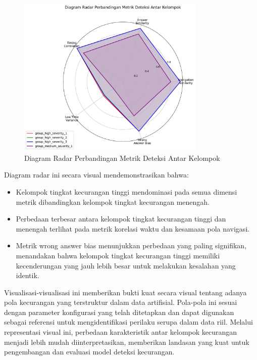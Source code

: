 \begin{figure}[htbp]
    \centering
    \includegraphics[width=0.8\textwidth]{figures/radar_chart_comparison.pdf}
    \caption{Diagram Radar Perbandingan Metrik Deteksi Antar Kelompok}
    \label{fig:radar_chart_comparison}
\end{figure}

Diagram radar ini secara visual mendemonstrasikan bahwa:
\begin{itemize}
    \item Kelompok tingkat kecurangan tinggi mendominasi pada semua dimensi metrik dibandingkan kelompok tingkat kecurangan menengah.
    \item Perbedaan terbesar antara kelompok tingkat kecurangan tinggi dan menengah terlihat pada metrik korelasi waktu dan kesamaan pola navigasi.
    \item Metrik wrong answer bias menunjukkan perbedaan yang paling signifikan, menandakan bahwa kelompok tingkat kecurangan tinggi memiliki kecenderungan yang jauh lebih besar untuk melakukan kesalahan yang identik.
\end{itemize}

Visualisasi-visualisasi ini memberikan bukti kuat secara visual tentang adanya pola kecurangan yang terstruktur dalam data artifisial. Pola-pola ini sesuai dengan parameter konfigurasi yang telah ditetapkan dan dapat digunakan sebagai referensi untuk mengidentifikasi perilaku serupa dalam data riil. Melalui representasi visual ini, perbedaan karakteristik antar kelompok kecurangan menjadi lebih mudah diinterpretasikan, memberikan landasan yang kuat untuk pengembangan dan evaluasi model deteksi kecurangan.%

